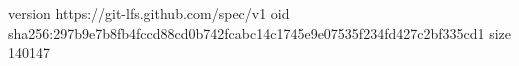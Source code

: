 version https://git-lfs.github.com/spec/v1
oid sha256:297b9e7b8fb4fccd88cd0b742fcabc14c1745e9e07535f234fd427c2bf335cd1
size 140147
